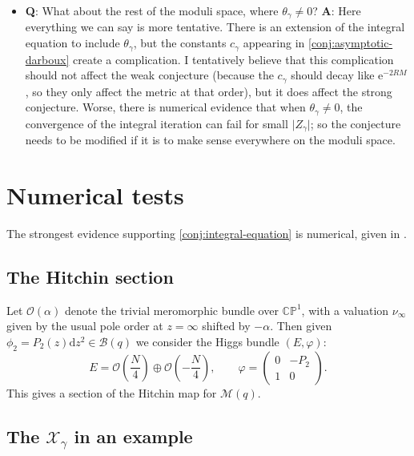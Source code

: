 \documentclass[12pt,letterpaper,reqno]{article}
\numberwithin{equation}{section}
\begin{document}
\begin{itemize}
  \item {\bf Q}: What about the rest of the moduli space, where $\theta_\gamma \neq 0$?
  {\bf A}: Here everything we can say is more tentative. 
  There is an extension of the integral equation to include $\theta_\gamma$, but the
  constants $c_\gamma$ appearing in \autoref{conj:asymptotic-darboux} create a complication. 
  I tentatively believe that this complication should not affect the weak conjecture 
  (because the $c_\gamma$ should decay like ${\mathrm e}^{-2 R M}$, so they only affect the
  metric at that order),
  but it does affect the strong conjecture. Worse, there is numerical evidence that
  when $\theta_\gamma \neq 0$, the convergence of the integral iteration can fail for 
  small $\lvert Z_\gamma \rvert$; so the conjecture needs to be modified if it is to make
  sense everywhere on the moduli space.
\end{itemize}

\section{Numerical tests}

The strongest evidence supporting \autoref{conj:integral-equation} is numerical,
given in \cite{dumas2020opers}.

\subsection{The Hitchin section}

\begin{defn}
Let $\mathcal O(\alpha)$ denote the trivial meromorphic bundle over $\mathbb C \mathbb P^1$, 
with a valuation $\nu_\infty$ given by the usual pole order at $z = \infty$ 
shifted by $-\alpha$.
Then given $\phi_2 = P_2(z) \mathrm{d} z^2 \in \mathcal B(q)$ we consider the Higgs bundle
$(E,\varphi)$:
\begin{equation}
  E = \mathcal O\left(\frac{N}{4}\right) \oplus \mathcal O\left(-\frac{N}{4}\right), \qquad \varphi = \begin{pmatrix} 0 & -P_2 \\ 1 & 0 \end{pmatrix}.
\end{equation}
This gives a section of the Hitchin map for $\mathcal M(q)$.
\end{defn}

\subsection{The \texorpdfstring{$\mathcal X_\gamma$}{Xgamma} in an example}
\end{document}
